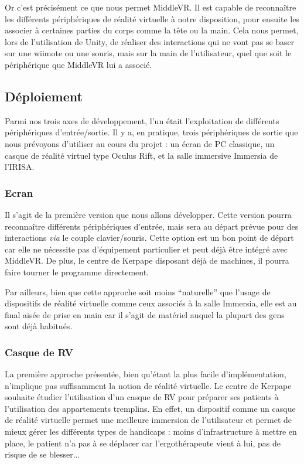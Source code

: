 Or c'est précisément ce que nous permet MiddleVR. Il est capable de reconnaître les différents périphériques de réalité virtuelle à notre disposition, pour ensuite les associer à certaines parties du corps comme la tête ou la main. Cela nous permet, lors de l'utilisation de Unity, de réaliser des interactions qui ne vont pas se  baser sur une wiimote ou une souris, mais sur la main de l'utilisateur, quel que soit le périphérique que MiddleVR lui a associé. 

\subsection{Déploiement}
Parmi nos trois axes de développement, l'un était l'exploitation de différents périphériques d'entrée/sortie. Il y a, en pratique, trois périphériques de sortie que nous prévoyons d'utiliser au cours du projet : un écran de PC classique, un casque de réalité virtuel type Oculus Rift, et la salle immersive Immersia de l'IRISA.

\subsubsection{Ecran}
Il s'agit de la première version que nous allons développer. Cette version pourra reconnaître différents périphériques d'entrée, mais sera au départ prévue pour des interactions \textit{via} le couple clavier/souris. Cette option est un bon point de départ car elle ne nécessite pas d'équipement particulier et peut déjà être intégré avec MiddleVR. De plus, le centre de Kerpape disposant déjà de machines, il pourra faire tourner le programme directement.

Par ailleurs, bien que cette approche soit moins \enquote{naturelle} que l'usage de dispositifs de réalité virtuelle comme ceux associés à la salle Immersia, elle est au final aisée de prise en main car il s'agit de matériel auquel la plupart des gens sont déjà habitués.

\subsubsection{Casque de RV}
La première approche présentée, bien qu'étant la plus facile d’implémentation, n'implique pas suffisamment la notion de réalité virtuelle. Le centre de Kerpape souhaite étudier l'utilisation d'un casque de RV pour préparer ses patients à l’utilisation des appartements tremplins. 
En effet, un dispositif comme un casque de réalité virtuelle permet une meilleure immersion de l'utilisateur et permet de mieux gérer les différents types de handicaps : moins d'infrastructure à mettre en place, le patient n'a pas à se déplacer car l'ergothérapeute vient à lui, pas de risque de se blesser...

